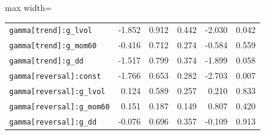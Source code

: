 \begin{table}[!htbp]
\begin{adjustbox}{max width=\textwidth}
\begin{tabular}{lrrrrr}
\texttt{gamma[trend]:g\_lvol} & -1.852 & 0.912 & 0.442 & -2.030 & 0.042\\
\texttt{gamma[trend]:g\_mom60} & -0.416 & 0.712 & 0.274 & -0.584 & 0.559\\
\texttt{gamma[trend]:g\_dd} & -1.517 & 0.799 & 0.374 & -1.899 & 0.058\\
\texttt{gamma[reversal]:const} & -1.766 & 0.653 & 0.282 & -2.703 & 0.007\\
\texttt{gamma[reversal]:g\_lvol} & 0.124 & 0.589 & 0.257 & 0.210 & 0.833\\
\texttt{gamma[reversal]:g\_mom60} & 0.151 & 0.187 & 0.149 & 0.807 & 0.420\\
\texttt{gamma[reversal]:g\_dd} & -0.076 & 0.696 & 0.357 & -0.109 & 0.913\\
\bottomrule
\end{tabular}
\end{adjustbox}
\end{table}